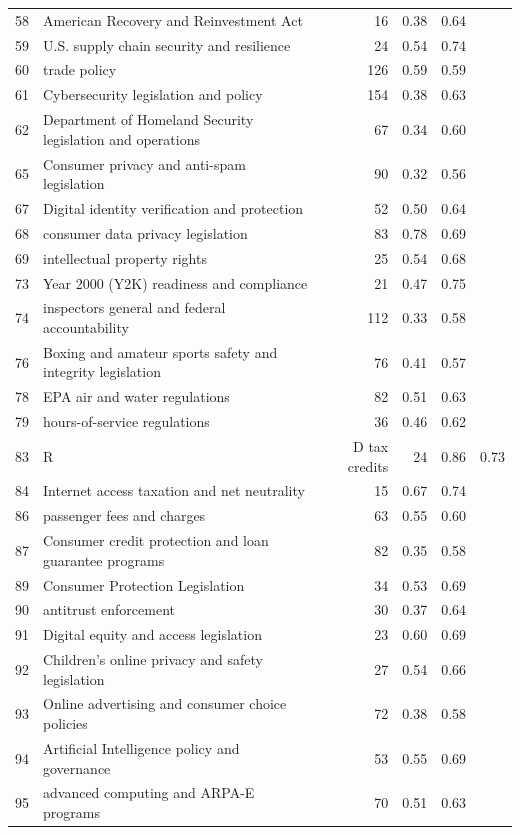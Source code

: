 \begin{longtable}{rlrrr}
58 & American Recovery and Reinvestment Act & 16 & 0.38 & 0.64 \\
59 & U.S. supply chain security and resilience & 24 & 0.54 & 0.74 \\
60 & trade policy & 126 & 0.59 & 0.59 \\
61 & Cybersecurity legislation and policy & 154 & 0.38 & 0.63 \\
62 & Department of Homeland Security legislation and operations & 67 & 0.34 & 0.60 \\
65 & Consumer privacy and anti-spam legislation & 90 & 0.32 & 0.56 \\
67 & Digital identity verification and protection & 52 & 0.50 & 0.64 \\
68 & consumer data privacy legislation & 83 & 0.78 & 0.69 \\
69 & intellectual property rights & 25 & 0.54 & 0.68 \\
73 & Year 2000 (Y2K) readiness and compliance & 21 & 0.47 & 0.75 \\
74 & inspectors general and federal accountability & 112 & 0.33 & 0.58 \\
76 & Boxing and amateur sports safety and integrity legislation & 76 & 0.41 & 0.57 \\
78 & EPA air and water regulations & 82 & 0.51 & 0.63 \\
79 & hours-of-service regulations & 36 & 0.46 & 0.62 \\
83 & R&D tax credits & 24 & 0.86 & 0.73 \\
84 & Internet access taxation and net neutrality & 15 & 0.67 & 0.74 \\
86 & passenger fees and charges & 63 & 0.55 & 0.60 \\
87 & Consumer credit protection and loan guarantee programs & 82 & 0.35 & 0.58 \\
89 & Consumer Protection Legislation & 34 & 0.53 & 0.69 \\
90 & antitrust enforcement & 30 & 0.37 & 0.64 \\
91 & Digital equity and access legislation & 23 & 0.60 & 0.69 \\
92 & Children's online privacy and safety legislation & 27 & 0.54 & 0.66 \\
93 & Online advertising and consumer choice policies & 72 & 0.38 & 0.58 \\
94 & Artificial Intelligence policy and governance & 53 & 0.55 & 0.69 \\
95 & advanced computing and ARPA-E programs & 70 & 0.51 & 0.63 \\

\end{longtable}
